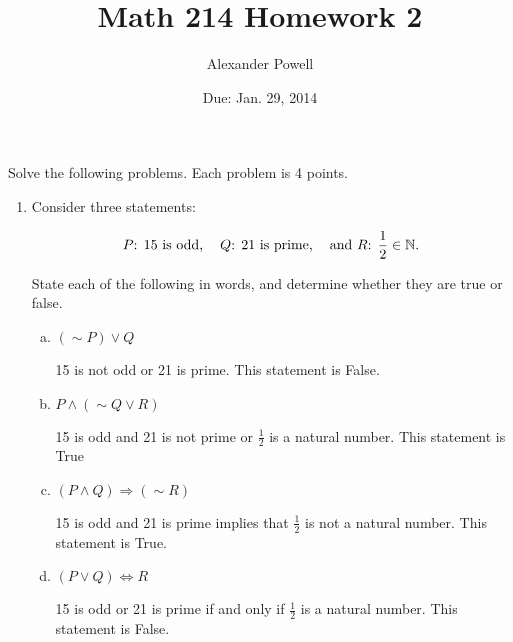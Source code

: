 \documentclass[10pt]{article} %
\title{Math 214 Homework 2}
\date{Due:  Jan. 29, 2014}
\author{Alexander Powell}
\newcommand{\N}{\mathbb{N}}
\begin{document}
\maketitle

Solve the following problems.  Each problem is 4 points.

\begin{enumerate}

\item  Consider three statements:

\begin{equation*}
\text{ $P$: $15$ is odd, \;\; $Q$: $21$ is prime, \;\; and $R$: $\frac{1}{2} \in \N$.  }
\end{equation*}

State each of the following in words, and determine whether they are true or false.
  \begin{enumerate}[(a)]
  \item $(\sim{P})\vee Q$
  
  \bigskip
  
    15 is not odd or 21 is prime.  This statement is False.  
  
  \bigskip
  
  \item $P\wedge (\sim Q \vee R)$
  
  \bigskip
  
    15 is odd and 21 is not prime or $\frac{1}{2}$ is a natural number.  This statement is True
  
  \bigskip
  
   \item $(P \wedge Q) \Rightarrow (\sim R)$
   
   \bigskip
   
     15 is odd and 21 is prime implies that $\frac{1}{2}$ is not a natural number.  This statement is True.  
   
   \bigskip
   
   \item $(P \vee Q) \Leftrightarrow R$
   
   \bigskip
   
     15 is odd or 21 is prime if and only if $\frac{1}{2}$ is a natural number.  This statement is False.  
   
   \bigskip
   
 \end{enumerate}


\end{enumerate}
\end{document}
